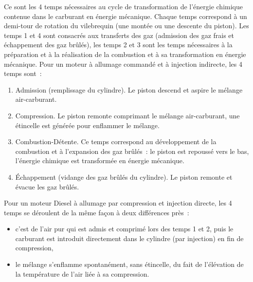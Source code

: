 \documentclass[8pt]{article}
\begin{document}
Ce sont les 4 temps nécessaires au cycle de transformation de l'énergie chimique contenue dans le carburant en énergie mécanique. Chaque temps correspond à un demi-tour de rotation du vilebrequin (une montée ou une descente du piston). Les temps 1 et 4 sont consacrés aux transferts des gaz (admission des gaz frais et échappement des gaz brûlés), les temps 2 et 3 sont les temps nécessaires à la préparation et à la réalisation de la combustion et à sa transformation en énergie mécanique. Pour un moteur à allumage commandé et à injection indirecte, les 4 temps sont~:
\begin{enumerate}
	\setlength\itemsep{-0.1em}
	\item Admission (remplissage du cylindre). Le piston descend et aspire le mélange air-carburant. 
	\item Compression. Le piston remonte comprimant le mélange air-carburant, une étincelle est générée pour enflammer le mélange.
	\item Combustion-Détente. Ce temps correspond au développement de la combustion et à l'expansion des gaz brûlés~: le piston est repoussé vers le bas, l’énergie chimique est transformée en énergie mécanique.
	\item Échappement (vidange des gaz brûlés du cylindre). Le piston remonte et évacue les gaz brûlés.
\end{enumerate}
\begin{center}
\end{center}

Pour un moteur Diesel à allumage par compression et injection directe, les 4 temps se déroulent de la même façon à deux différences près~:
\begin{itemize}
	\setlength\itemsep{-0.1em}
	\item c'est de l'air pur qui est admis et comprimé lors des temps 1 et 2, puis le carburant est introduit directement dans le cylindre (par injection) en fin de compression,
	\item le mélange s’enflamme spontanément, sans étincelle, du fait de l'élévation de la température de l'air liée à sa compression.
\end{itemize}
\end{document}
